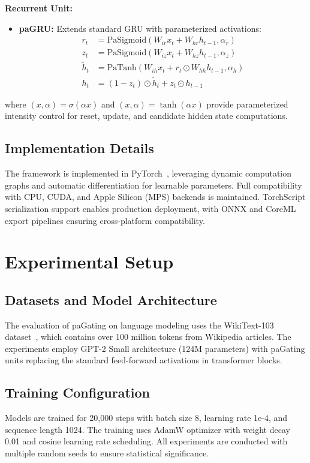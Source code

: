 \documentclass[lettersize,journal]{IEEEtran}
\begin{document}
\textbf{Recurrent Unit:}
\begin{itemize}
\item \textbf{paGRU:} Extends standard GRU with parameterized activations:
  \begin{align}
  r_t &= \text{PaSigmoid}(W_{ir}x_t + W_{hr}h_{t-1}, \alpha_r) \\
  z_t &= \text{PaSigmoid}(W_{iz}x_t + W_{hz}h_{t-1}, \alpha_z) \\
  \tilde{h}_t &= \text{PaTanh}(W_{ih}x_t + r_t \odot W_{hh}h_{t-1}, \alpha_h) \\
  h_t &= (1-z_t) \odot \tilde{h}_t + z_t \odot h_{t-1}
  \end{align}
\end{itemize}

where $(x, \alpha) = \sigma(\alpha x)$ and $(x, \alpha) = \tanh(\alpha x)$ provide parameterized intensity control for reset, update, and candidate hidden state computations.

\subsection{Implementation Details}
The framework is implemented in PyTorch~\cite{paszke2019pytorch}, leveraging dynamic computation graphs and automatic differentiation for learnable parameters. Full compatibility with CPU, CUDA, and Apple Silicon (MPS) backends is maintained. TorchScript serialization support enables production deployment, with ONNX and CoreML export pipelines ensuring cross-platform compatibility.

\section{Experimental Setup}

\subsection{Datasets and Model Architecture}
The evaluation of paGating on language modeling uses the WikiText-103 dataset~\cite{merity2016pointer}, which contains over 100 million tokens from Wikipedia articles. The experiments employ GPT-2 Small architecture (124M parameters) with paGating units replacing the standard feed-forward activations in transformer blocks.

\subsection{Training Configuration}
Models are trained for 20,000 steps with batch size 8, learning rate 1e-4, and sequence length 1024. The training uses AdamW optimizer with weight decay 0.01 and cosine learning rate scheduling. All experiments are conducted with multiple random seeds to ensure statistical significance.
\end{document}
